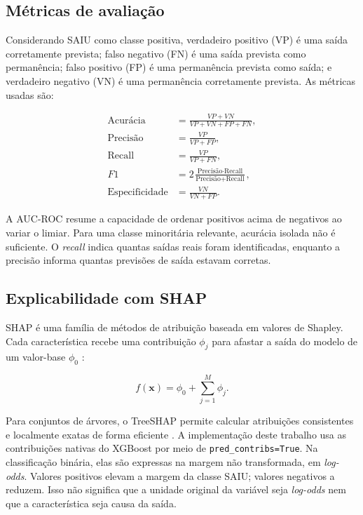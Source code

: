 \documentclass[12pt]{article}
\begin{document}
\subsection{Métricas de avaliação}

Considerando SAIU como classe positiva, verdadeiro positivo (VP) é uma saída corretamente prevista; falso negativo (FN) é uma saída prevista como permanência; falso positivo (FP) é uma permanência prevista como saída; e verdadeiro negativo (VN) é uma permanência corretamente prevista. As métricas usadas são:

\begin{align}
\text{Acurácia} &= \frac{VP+VN}{VP+VN+FP+FN},\\
\text{Precisão} &= \frac{VP}{VP+FP},\\
\text{Recall} &= \frac{VP}{VP+FN},\\
F1 &= 2\frac{\text{Precisão}\cdot\text{Recall}}{\text{Precisão}+\text{Recall}},\\
\text{Especificidade} &= \frac{VN}{VN+FP}.
\end{align}

A AUC-ROC resume a capacidade de ordenar positivos acima de negativos ao variar o limiar. Para uma classe minoritária relevante, acurácia isolada não é suficiente. O \textit{recall} indica quantas saídas reais foram identificadas, enquanto a precisão informa quantas previsões de saída estavam corretas.

\subsection{Explicabilidade com SHAP}

SHAP é uma família de métodos de atribuição baseada em valores de Shapley. Cada característica recebe uma contribuição $\phi_j$ para afastar a saída do modelo de um valor-base $\phi_0$ \cite{lundberg2017shap}:

\begin{equation}
f(\mathbf{x})=\phi_0+\sum_{j=1}^{M}\phi_j.
\end{equation}

Para conjuntos de árvores, o TreeSHAP permite calcular atribuições consistentes e localmente exatas de forma eficiente \cite{lundberg2020treeshap}. A implementação deste trabalho usa as contribuições nativas do XGBoost por meio de \texttt{pred\_contribs=True}. Na classificação binária, elas são expressas na margem não transformada, em \textit{log-odds}. Valores positivos elevam a margem da classe SAIU; valores negativos a reduzem. Isso não significa que a unidade original da variável seja \textit{log-odds} nem que a característica seja causa da saída.
\end{document}
